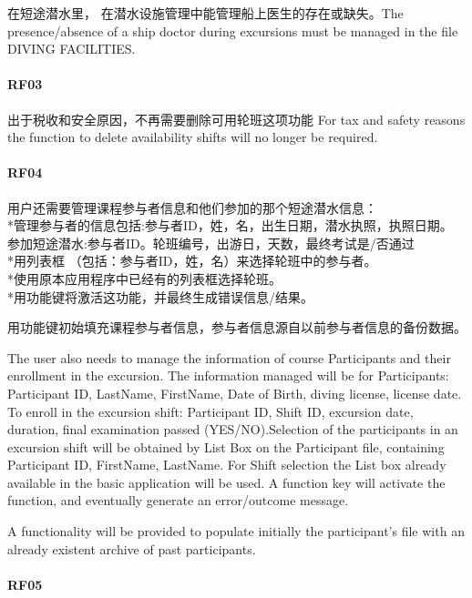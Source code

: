 在短途潜水里， 在潜水设施管理中能管理船上医生的存在或缺失。The
presence/absence of a ship doctor during excursions must be managed in
the file DIVING FACILITIES.

\hypertarget{rf03-1}{%
\paragraph{RF03}\label{rf03-1}}

出于税收和安全原因，不再需要删除可用轮班这项功能 For tax and safety
reasons the function to delete availability shifts will no longer be
required.

\hypertarget{rf04-1}{%
\paragraph{RF04}\label{rf04-1}}

用户还需要管理课程参与者信息和他们参加的那个短途潜水信息：\\
*管理参与者的信息包括:参与者ID，姓，名，出生日期，潜水执照，执照日期。\\
参加短途潜水:参与者ID。轮班编号，出游日，天数，最终考试是/否通过\\
*用列表框 （包括：参与者ID，姓，名）来选择轮班中的参与者。\\
*使用原本应用程序中已经有的列表框选择轮班。\\
*用功能键将激活这功能，并最终生成错误信息/结果。

用功能键初始填充课程参与者信息，参与者信息源自以前参与者信息的备份数据。

The user also needs to manage the information of course Participants and
their enrollment in the excursion. The information managed will be for
Participants: Participant ID, LastName, FirstName, Date of Birth, diving
license, license date. To enroll in the excursion shift: Participant ID,
Shift ID, excursion date, duration, final examination passed
(YES/NO).Selection of the participants in an excursion shift will be
obtained by List Box on the Participant file, containing Participant ID,
FirstName, LastName. For Shift selection the List box already available
in the basic application will be used. A function key will activate the
function, and eventually generate an error/outcome message.

A functionality will be provided to populate initially the participant's
file with an already existent archive of past participants.

\hypertarget{rf05-1}{%
\paragraph{RF05}\label{rf05-1}}


